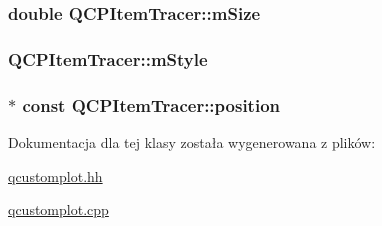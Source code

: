 \subsubsection[{\texorpdfstring{m\+Size}{mSize}}]{\setlength{\rightskip}{0pt plus 5cm}double Q\+C\+P\+Item\+Tracer\+::m\+Size\hspace{0.3cm}{\ttfamily [protected]}}\hypertarget{class_q_c_p_item_tracer_a575153a24bb357d1e006f6bc3bd099b9}{}\label{class_q_c_p_item_tracer_a575153a24bb357d1e006f6bc3bd099b9}
\subsubsection[{\texorpdfstring{m\+Style}{mStyle}}]{ Q\+C\+P\+Item\+Tracer\+::m\+Style\hspace{0.3cm}{\ttfamily [protected]}}\hypertarget{class_q_c_p_item_tracer_afb1f236bebf417544e0138fef22a292e}{}\label{class_q_c_p_item_tracer_afb1f236bebf417544e0138fef22a292e}
\subsubsection[{\texorpdfstring{position}{position}}]{$\ast$ const Q\+C\+P\+Item\+Tracer\+::position}\hypertarget{class_q_c_p_item_tracer_a69917e2fdb2b3a929c196958feee7cbe}{}\label{class_q_c_p_item_tracer_a69917e2fdb2b3a929c196958feee7cbe}


Dokumentacja dla tej klasy została wygenerowana z plików\+:\begin{DoxyCompactItemize}
\item 
\hyperlink{qcustomplot_8hh}{qcustomplot.\+hh}\item 
\hyperlink{qcustomplot_8cpp}{qcustomplot.\+cpp}\end{DoxyCompactItemize}
